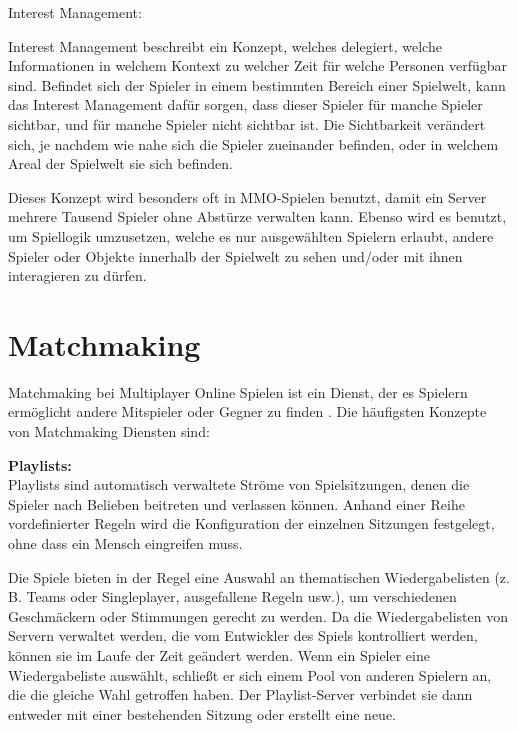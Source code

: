 \textsf{\Large Interest Management:}
\label{interest_management}

Interest Management beschreibt ein Konzept, welches delegiert, welche Informationen in welchem Kontext zu welcher Zeit für welche Personen verfügbar sind. Befindet sich der Spieler in einem bestimmten Bereich einer Spielwelt, kann das Interest Management dafür sorgen, dass dieser Spieler für manche Spieler sichtbar, und für manche Spieler nicht sichtbar ist. Die Sichtbarkeit verändert sich, je nachdem wie nahe sich die Spieler zueinander befinden, oder in welchem Areal der Spielwelt sie sich befinden.

Dieses Konzept wird besonders oft in MMO-Spielen \cite{Wikipedia.2021i} benutzt, damit ein Server mehrere Tausend Spieler ohne Abstürze verwalten kann. Ebenso wird es benutzt, um Spiellogik umzusetzen, welche es nur ausgewählten Spielern erlaubt, andere Spieler oder Objekte innerhalb der Spielwelt zu sehen und/oder mit ihnen interagieren zu dürfen. \cite{Smed.2002c}

\newpage

\section{Matchmaking}

Matchmaking bei Multiplayer Online Spielen ist ein Dienst, der es Spielern ermöglicht andere Mitspieler oder Gegner zu finden \cite{.2014}.  Die häufigsten Konzepte von Matchmaking Diensten sind:

\textbf{Playlists:} \\
Playlists sind automatisch verwaltete Ströme von Spielsitzungen, denen die Spieler nach Belieben beitreten und verlassen können. Anhand einer Reihe vordefinierter Regeln wird die Konfiguration der einzelnen Sitzungen festgelegt, ohne dass ein Mensch eingreifen muss.  

Die Spiele bieten in der Regel eine Auswahl an thematischen Wiedergabelisten (z. B. Teams oder Singleplayer, ausgefallene Regeln usw.), um verschiedenen Geschmäckern oder Stimmungen gerecht zu werden. Da die Wiedergabelisten von Servern verwaltet werden, die vom Entwickler des Spiels kontrolliert werden, können sie im Laufe der Zeit geändert werden. Wenn ein Spieler eine Wiedergabeliste auswählt, schließt er sich einem Pool von anderen Spielern an, die die gleiche Wahl getroffen haben. Der Playlist-Server verbindet sie dann entweder mit einer bestehenden Sitzung oder erstellt eine neue. 

\cite{Wikipedia.2021b}

